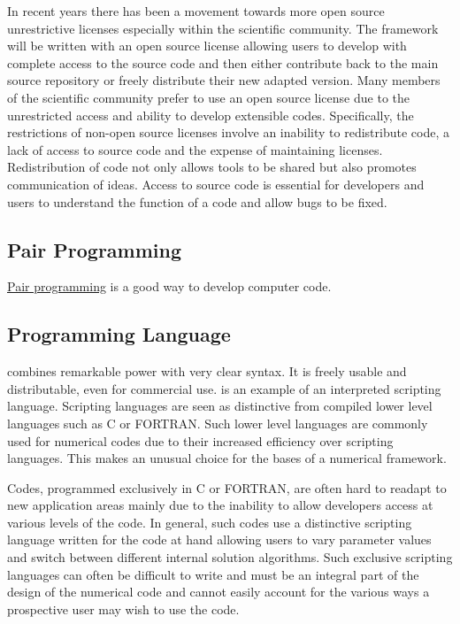 In recent years there has been a movement towards more open source
unrestrictive licenses especially within the scientific community. The
\FiPy{} framework will be written with an open source license allowing
users to develop with complete access to the source code and then
either contribute back to the main source repository or freely
distribute their new adapted version. Many members of the scientific
community prefer to use an open source license due to the unrestricted
access and ability to develop extensible codes. Specifically, the
restrictions of non-open source licenses involve an inability to
redistribute code, a lack of access to source code and the expense of
maintaining licenses. Redistribution of code not only allows tools to
be shared but also promotes communication of ideas. Access to source
code is essential for developers and users to understand the function
of a code and allow bugs to be fixed.

\subsection{Pair Programming}

\href{http://www.extremeprogramming.org/rules/pair.html}{Pair programming}
is a good way to develop computer code.

\subsection{\Python{} Programming Language}

\Python{} combines remarkable power with very clear syntax. It is
freely usable and distributable, even for commercial use. \Python{} is
an example of an interpreted scripting language. Scripting languages
are seen as distinctive from compiled lower level languages such as C
or FORTRAN. Such lower level languages are commonly used for numerical
codes due to their increased efficiency over scripting languages. This
makes \Python{} an unusual choice for the bases of a numerical
framework.

Codes, programmed exclusively in C or FORTRAN, are often hard to
readapt to new application areas mainly due to the inability to allow
developers access at various levels of the code. In general, such
codes use a distinctive scripting language written for the code at
hand allowing users to vary parameter values and switch between
different internal solution algorithms. Such exclusive scripting
languages can often be difficult to write and must be an integral part
of the design of the numerical code and cannot easily account for the
various ways a prospective user may wish to use the code.

